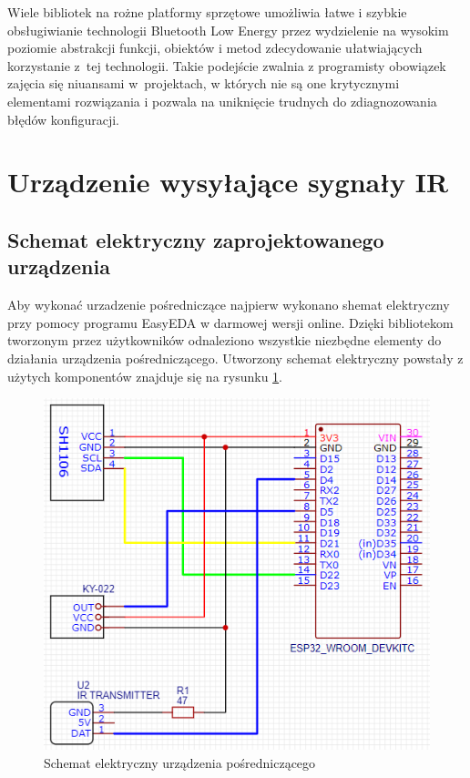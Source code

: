 \documentclass[12pt,twoside]{article}
\begin{document}
Wiele bibliotek na rożne platformy sprzętowe umożliwia łatwe i szybkie obsługiwianie technologii Bluetooth Low Energy przez wydzielenie na wysokim poziomie abstrakcji funkcji, obiektów i metod zdecydowanie ułatwiających korzystanie z~tej technologii. Takie podejście zwalnia z programisty obowiązek zajęcia się niuansami w~projektach, w których nie są one krytycznymi elementami rozwiązania i pozwala na uniknięcie trudnych do zdiagnozowania błędów konfiguracji.

\clearpage

\section{Urządzenie wysyłające sygnały IR}
\subsection{Schemat elektryczny zaprojektowanego urządzenia}
Aby wykonać urzadzenie pośredniczące najpierw wykonano shemat elektryczny przy pomocy programu EasyEDA w darmowej wersji online\cite{easyEda}. Dzięki bibliotekom tworzonym przez użytkowników odnaleziono wszystkie niezbędne elementy do działania urządzenia pośredniczącego. Utworzony schemat elektryczny powstały z użytych komponentów znajduje się na rysunku \ref*{Fig:deviceScheme}.
\begin{figure}[ht]
   \centering
   \includegraphics[width=12cm]{images/deviceScheme.png}
   \caption{Schemat elektryczny urządzenia pośredniczącego}
   \label{Fig:deviceScheme}
\end{figure}
\end{document}
